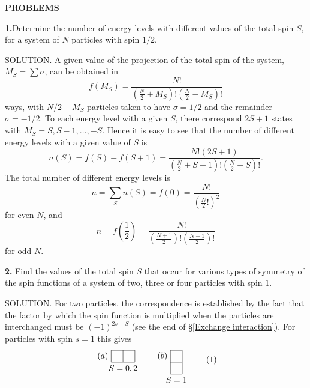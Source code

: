 {\small
	
\textbf{PROBLEMS}


\textbf{1.}Determine the number of energy levels with different values of the total spin $ S $, for a system of $ N $ particles with spin $ 1/2 $.





SOLUTION. A given value of the projection of the total spin of the system, $ M_S = \sum \sigma $, can be obtained in
\[ f(M_S)=\frac{N!}{\left(\frac{N}{2}+M_S \right)!\left(\frac{N}{2}-M_S \right)!} \]
ways, with $ N/2 + M_S $ particles taken to have $ \sigma=1/2 $ and the remainder $ \sigma = -1/2 $. To each energy level with a given $ S $, there correspond $ 2S+1 $ states with $ M_S = S, S-1, \dots, -S $. Hence it is easy to see that the number of different energy levels with a given value of $ S $ is
\[ n(S)=f(S)-f(S+1)=\frac{N!(2S+1)}{\left(\frac{N}{2}+S+1 \right)!\left(\frac{N}{2}-S \right)!} .\]
The total number of different energy levels is
\[ n=\sum_S n(S)=f(0)=\frac{N!}{\left( \frac{N}{2}!\right)^2} \]
for even $ N $, and
\[ n=f\left(\frac{1}{2}\right)=\frac{N!}{\left(\frac{N+1}{2} \right)!\left(\frac{N-1}{2} \right)!} \]
for odd $ N $.





\textbf{2.} Find the values of the total spin $ S $ that occur for various types of symmetry of the spin functions of a system of two, three or four particles with spin $ 1 $.





SOLUTION. For two particles, the correspondence is established by the fact that the factor by which the spin function is multiplied when the particles are interchanged must be $ (-1)^{2s-S} $ (see the end of \S\ref{Exchange interaction}). For particles with spin $ s = 1 $ this gives
\begin{equation}\label{63-2-1}
\begin{tikzpicture}[baseline,scale=0.5]
\draw (0,0)--(2,0);
\draw (0,1)--(2,1);
\draw (5,-1)--(6,-1);
\draw (5,0)--(6,0);
\draw (5,1)--(6,1);
\draw (0,0)--(0,1);
\draw (1,0)--(1,1);
\draw (2,0)--(2,1);
\draw (5,-1)--(5,1);
\draw (6,-1)--(6,1);
\node[below] at (1,0) {$ S=0,2 $};
\node[below] at (5.5,-1) {$ S=1 $};
\node[left] at (0,0.5) {$ (a) $};
\node[left] at (5,0.5) {$ (b) $}; 
\end{tikzpicture}\tag{1}
\end{equation}



}

